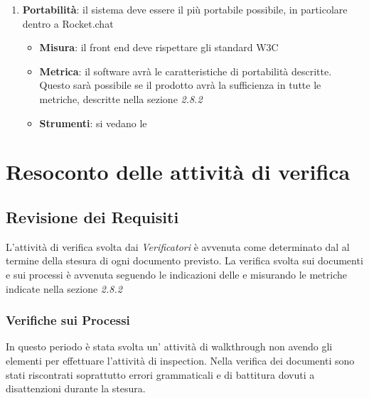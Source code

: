 {\begin{enumerate}
  \item \textbf{Portabilità}: il sistema deve essere il più portabile possibile, in particolare dentro a Rocket.chat
    \begin{itemize}
    \item \textbf{Misura}: il front end deve rispettare gli standard W3C
    \item \textbf{Metrica}: il software avrà le caratteristiche di
      portabilità descritte. Questo sarà possibile se il prodotto
      avrà la sufficienza in tutte le metriche, descritte nella sezione \emph{2.8.2}
    \item \textbf{Strumenti}: si vedano le  \normediprogetto
    \end{itemize}
  \end{enumerate}




  \section{Resoconto delle attività di verifica}

  \subsection{Revisione dei Requisiti}

  L'attività di verifica svolta dai  \emph{Verificatori}  è avvenuta come determinato dal \emph{\pianodiprogetto} al termine della stesura di ogni documento previsto. La verifica svolta sui documenti e
  sui processi è avvenuta seguendo le indicazioni delle  \emph{\normediprogetto}  e misurando le
  metriche indicate nella sezione \emph{2.8.2}

  \subsubsection{Verifiche sui Processi}

  In questo periodo è stata svolta un' attività di walkthrough non avendo gli elementi
  per effettuare l'attività di inspection. Nella verifica dei
  documenti sono stati riscontrati soprattutto errori grammaticali e
  di battitura dovuti a disattenzioni durante la stesura. 

}

